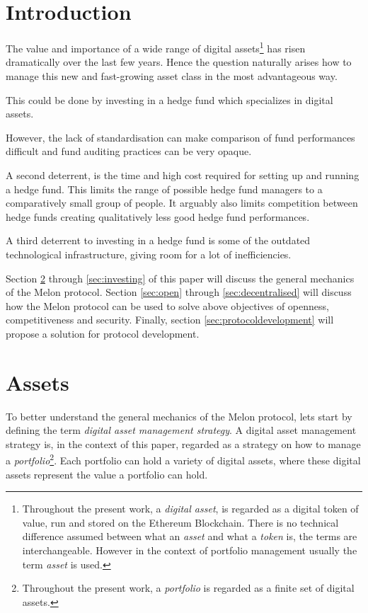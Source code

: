 \documentclass[9pt,oneside]{amsart}
\theoremstyle{plain}
\begin{document}
    \begin{multicols}{2}
        
    \section{Introduction}\label{sec:introduction}
    
    The value and importance of a wide range of digital assets\footnote{Throughout the present work, a \textit{digital asset}, is regarded as a digital token of value, run and stored on the Ethereum Blockchain. There is no technical difference assumed between what an \textit{asset} and what a \textit{token} is, the terms are interchangeable. However in the context of portfolio management usually the term \textit{asset} is used.} has risen dramatically over the last few years. Hence the question naturally arises how to manage this new and fast-growing asset class in the most advantageous way.
    
    This could be done by investing in a hedge fund which specializes in digital assets. 
    
    However, the lack of standardisation can make comparison of fund performances difficult and fund auditing practices can be very opaque.
    
    A second deterrent, is the time and high cost required for setting up and running a hedge fund. This limits the range of possible hedge fund managers to a comparatively small group of people. It arguably also limits competition between hedge funds creating qualitatively less good hedge fund performances\cite{mitstudy}. 
    
    A third deterrent to investing in a hedge fund is some of the outdated technological infrastructure, giving room for a lot of inefficiencies.
    
    Section \ref{sec:assets} through \ref{sec:investing} of this paper will discuss the general mechanics of the Melon protocol.
    Section \ref{sec:open} through \ref{sec:decentralised} will discuss how the Melon protocol can be used to solve above objectives of openness, competitiveness and security.
    Finally, section \ref{sec:protocoldevelopment} will propose a solution for protocol development.
    
    \section{Assets}\label{sec:assets}
    
    To better understand the general mechanics of the Melon protocol, lets start by defining the term \textit{digital asset management strategy}. A digital asset management strategy is, in the context of this paper, regarded as a strategy on how to manage a \textit{portfolio}\footnote{Throughout the present work, a \textit{portfolio} is regarded as a finite set of digital assets.}.
    Each portfolio can hold a variety of digital assets, where these digital assets represent the value a portfolio can hold.
    

\end{multicols}
\end{document}
